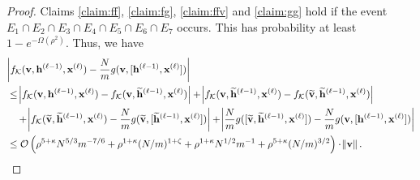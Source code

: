 \begin{proof}
	Claims \ref{claim:ff}, \ref{claim:fg}, \ref{claim:ffv} and \ref{claim:gg} hold if the event $E_1 \cap E_2 \cap E_3 \cap E_4 \cap E_5 \cap E_6 \cap E_7$ occurs. This has probability at least $1 - e^{-\Omega(\rho^2)}$. Thus, we have
	\begin{align*}
		&\abs{f_{\mathcal{K}}(\mathbf{v}, \mathbf{h}^{(\ell-1)}, \mathbf{x}^{(\ell)}) - \frac{N}{m}g(\mathbf{v}, [\mathbf{h}^{(\ell-1)}, \mathbf{x}^{(\ell)}])} \\
		&\le  \abs{f_{\mathcal{K}}(\mathbf{v}, \mathbf{h}^{(\ell-1)}, \mathbf{x}^{(\ell)}) - f_{\mathcal{K}}(\mathbf{v}, \widetilde{\mathbf{h}}^{(\ell-1)}, \mathbf{x}^{(\ell)}) } + \abs{f_{\mathcal{K}}(\mathbf{v}, \widetilde{\mathbf{h}}^{(\ell-1)}, \mathbf{x}^{(\ell)}) - f_{\mathcal{K}}(\widetilde{\mathbf{v}}, \widetilde{\mathbf{h}}^{(\ell-1)}, \mathbf{x}^{(\ell)}) }
		\\& \quad  + \abs{f_{\mathcal{K}}(\widetilde{\mathbf{v}}, \widetilde{\mathbf{h}}^{(\ell-1)}, \mathbf{x}^{(\ell)}) - \frac{N}{m}g(\widetilde{\mathbf{v}}, [\widetilde{\mathbf{h}}^{(\ell-1)}, \mathbf{x}^{(\ell)}])}  + \abs{\frac{N}{m}g([\widetilde{\mathbf{v}}, \widetilde{\mathbf{h}}^{(\ell-1)},  \mathbf{x}^{(\ell)}]) - \frac{N}{m}g(\mathbf{v}, [\mathbf{h}^{(\ell-1)},  \mathbf{x}^{(\ell)}])}\\
		&\le  \mathcal{O}\left(\rho^{5 + \kappa} N^{5/3} m^{-7/6} + \rho^{1 + \kappa} (N/m)^{1+\zeta} + \rho^{1+\kappa} N^{1/2} m^{-1}  + \rho^{5 + \kappa} (N/m)^{3/2}\right) \cdot \norm{\mathbf{v}}.
	\end{align*}
\end{proof}
